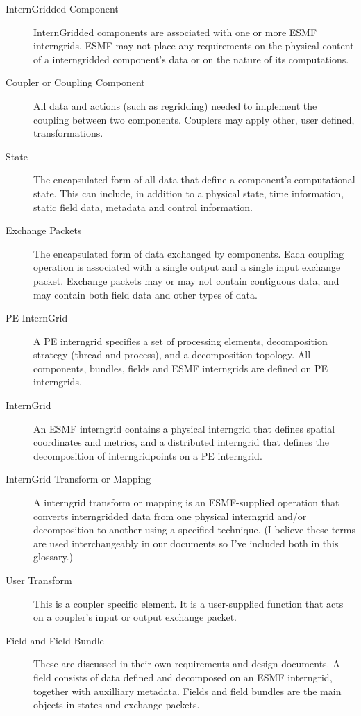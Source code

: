 
\begin{description}

\item [InternGridded Component] \label{glos:GC}
InternGridded components are associated with one or more ESMF 
interngrids.  ESMF may not place any requirements  on the physical content of a
interngridded component's data or on the nature of its computations. 

\item [Coupler or Coupling Component] \label{glos:Cplr}
All data and actions (such as regridding) needed to implement the
coupling between two components.  Couplers may apply other, user 
defined, transformations. 

\item [State] \label{glos:State} The encapsulated form of all data that
define a component's computational state. This can include,
in addition to a physical state,  time information, static field data,
metadata and control information. 

\item [Exchange Packets] \label{glos:EP} The encapsulated form of 
data exchanged by components.  Each coupling operation is 
associated with a single output and a single input exchange packet.
Exchange packets may or may not contain contiguous data, and may 
contain both field data and other types of data.

\item [PE InternGrid] \label{glos:PEInternGrid} A PE interngrid specifies a set of 
processing elements, decomposition strategy (thread and process), and 
a decomposition topology.  All components, bundles, fields and ESMF
interngrids are defined on PE interngrids.

\item [InternGrid] An ESMF interngrid contains a physical interngrid 
that defines spatial coordinates and metrics, and a distributed interngrid that 
defines the decomposition of interngridpoints on a PE interngrid.

\item [InternGrid Transform or Mapping] \label{glos:GrdTrans} A interngrid transform 
or mapping is an ESMF-supplied operation that converts interngridded data 
from one physical interngrid and/or decomposition to another using a specified 
technique.  (I believe these terms are used interchangeably in our documents 
so I've included both in this glossary.)

\item [User Transform] \label{glos:UsrTrans} This is a coupler specific
element. It is a user-supplied function that acts on a coupler's
input or output exchange packet.

\item [Field and Field Bundle] These are discussed in their own 
requirements and design documents. A field consists of data defined 
and decomposed on an ESMF interngrid, together with auxilliary metadata. 
Fields and field bundles are the main objects in states and exchange 
packets.

\end{description}




